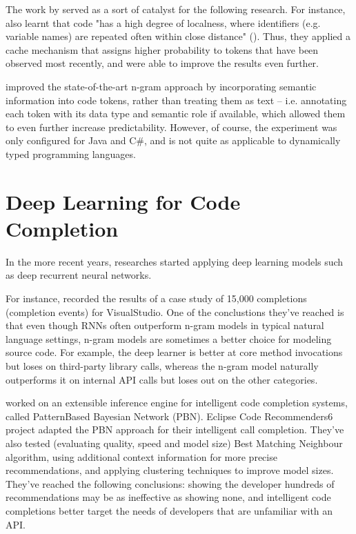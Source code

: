 The work by \cite{Hind12a} served as a sort of catalyst for the following research. For instance, \cite{Tu14a} also learnt that code "has a high degree of localness, where identifiers (e.g. variable names) are repeated often within close distance" (\cite{Alla18a}). Thus, they applied a cache mechanism that assigns higher probability to tokens that have been observed most recently, and were able to improve the results even further.

\cite{Nguy13a} improved the state-of-the-art n-gram approach by incorporating semantic information into code tokens, rather than treating them as text -- i.e. annotating each token with its data type and semantic role if available, which allowed them to even further increase predictability. However, of course, the experiment was only configured for Java and C\#, and is not quite as applicable to dynamically typed programming languages.

\section{Deep Learning for Code Completion}
In the more recent years, researches started applying deep learning models such as deep recurrent neural networks.

For instance, \cite{Hell19a} recorded the results of a case study of 15,000 completions (completion events) for VisualStudio. One of the conclustions they've reached is that even though RNNs often outperform n-gram models in typical natural language settings, n-gram models are sometimes a better choice for modeling source code. For example, the deep learner is better at core method invocations but loses on third-party library calls, whereas the n-gram model naturally outperforms it on internal API calls but loses out on the other categories.

\cite{Prok15a} worked on an extensible inference engine for intelligent code completion systems, called PatternBased Bayesian Network (PBN). Eclipse Code Recommenders6 project adapted the PBN approach for their intelligent call completion. They've also tested (evaluating quality, speed and model size) Best Matching Neighbour algorithm, using additional context information for more precise recommendations, and applying clustering techniques to improve model sizes. They've reached the following conclusions: showing the developer hundreds of recommendations may be as ineffective as showing none, and intelligent code completions better target the needs of developers that are unfamiliar with an API.

